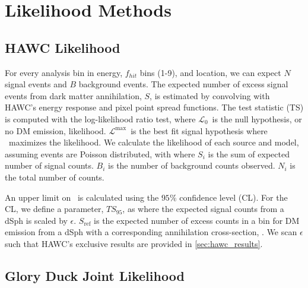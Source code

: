 



\section{Likelihood Methods} \label{sec:gd_ll_methods}

\subsection{HAWC Likelihood}\label{sec:gd_hawc_llh}

For every analysis bin in energy, $f_{hit}$ bins (1-9), and location, we can expect $N$ signal events and $B$ background events.
The expected number of excess signal events from dark matter annihilation, $S$, is estimated by convolving  with HAWC's energy response and pixel point spread functions.
The test statistic (TS) is computed with the log-likelihood ratio test,
\gdTS
where $\mathcal{L}_0$~is the null hypothesis, or no DM emission, likelihood.
$\mathcal{L}^\mathrm{max}$~is the best fit signal hypothesis where \sv~maximizes the likelihood.
We calculate the likelihood of each source and model, assuming events are Poisson distributed, with
\hwcpsLLH
where $S_i$ is the sum of expected number of signal counts.
$B_i$ is the number of background counts observed.
$N_i$ is the total number of counts.

An upper limit on \sv~is calculated using the $95\%$ confidence level (CL).
For the CL, we define a parameter, $TS_{95}$, as
\gdHAWCCL
where the expected signal counts from a dSph is scaled by $\epsilon$.
$S_\mathrm{ref}$ is the expected number of excess counts in a bin for DM emission from a dSph with a corresponding annihilation cross-section, \sv.
We scan $\epsilon$ such that
\CLbyTS
HAWC's exclusive results are provided in \cref{sec:hawc_results}.

\subsection{Glory Duck Joint Likelihood}\label{sec:gd_joint_llh}

